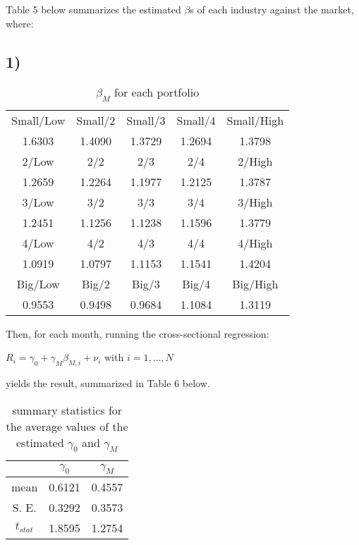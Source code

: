 \documentclass{report}
\begin{document}
Table 5 below summarizes the estimated $\beta$s of each industry against the market, where:

\subsection{1)}

\begin{table}[ht]
\centering
\caption{$\beta_M$ for each portfolio}
\begin{tabular}{c | c | c | c | c}
\hline\hline
Small/Low	& Small/2	& Small/3	& Small/4	& Small/High	\\	
1.6303	& 1.4090	& 1.3729	& 1.2694	& 1.3798		\\	[0.5ex] \hline

2/Low	& 2/2	& 2/3	& 2/4	& 2/High		\\	
1.2659	& 1.2264	& 1.1977	& 1.2125	& 1.3787		\\	[0.5ex] \hline

3/Low	& 3/2	& 3/3	& 3/4	& 3/High		\\	
1.2451	& 1.1256	& 1.1238	& 1.1596	& 1.3779		\\	[0.5ex] \hline

4/Low	& 4/2	& 4/3	& 4/4	& 4/High		\\	
1.0919	& 1.0797	& 1.1153	& 1.1541	& 1.4204		\\	[0.5ex] \hline
	
Big/Low	& Big/2	& Big/3	& Big/4	& Big/High		\\	
0.9553	& 0.9498	& 0.9684	& 1.1084	& 1.3119		\\	[1ex] \hline \hline
\end{tabular}
\end{table}

Then, for each month, running the cross-sectional regression:
\begin{center}
	$R_i = \gamma_0 + \gamma_M \beta_{M, i} + \nu_i$ with $i = 1, \dots, N$
\end{center}
yields the result, summarized in Table 6 below.

\begin{table}[ht]
\centering
\caption{summary statistics for the average values of the estimated $\gamma_0$ and $\gamma_M$}
\begin{tabular}{c | c | c}
		& $\gamma_0$	& $\gamma_M$	\\	[0.5ex] 	\hline
mean	& 0.6121		& 0.4557		\\
S. E.		& 0.3292		& 0.3573		\\
$t_{stat}$	& 1.8595		& 1.2754		\\ 	[0.5ex]	\hline \hline
\end{tabular}
\end{table}
\end{document}
